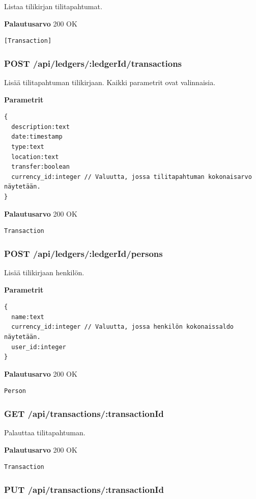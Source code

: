 \documentclass[a4paper,parskip=half]{scrartcl}
\begin{document}
Listaa tilikirjan tilitapahtumat.

\textbf{Palautusarvo}
200 OK
\begin{Verbatim}
[Transaction]
\end{Verbatim}

\subsubsection{POST /api/ledgers/:ledgerId/transactions}

Lisää tilitapahtuman tilikirjaan. Kaikki parametrit ovat valinnaisia.

\textbf{Parametrit}
\begin{Verbatim}
{
  description:text
  date:timestamp
  type:text
  location:text
  transfer:boolean
  currency_id:integer // Valuutta, jossa tilitapahtuman kokonaisarvo näytetään.
}
\end{Verbatim}

\textbf{Palautusarvo}
200 OK
\begin{Verbatim}
Transaction
\end{Verbatim}

\subsubsection{POST /api/ledgers/:ledgerId/persons}

Lisää tilikirjaan henkilön.

\textbf{Parametrit}
\begin{Verbatim}
{
  name:text
  currency_id:integer // Valuutta, jossa henkilön kokonaissaldo näytetään.
  user_id:integer
}
\end{Verbatim}

\textbf{Palautusarvo}
200 OK
\begin{Verbatim}
Person
\end{Verbatim}

\subsubsection{GET /api/transactions/:transactionId}

Palauttaa tilitapahtuman.

\textbf{Palautusarvo}
200 OK
\begin{Verbatim}
Transaction
\end{Verbatim}

\subsubsection{PUT /api/transactions/:transactionId}
\end{document}

